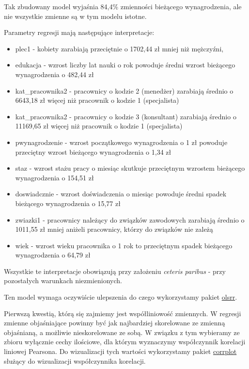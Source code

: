 \documentclass[]{book}
\providecommand{\tightlist}{%
  \setlength{\itemsep}{0pt}\setlength{\parskip}{0pt}}
\begin{document}
Tak zbudowany model wyjaśnia 84,4\% zmienności bieżącego wynagrodzenia, ale nie wszystkie zmienne są w tym modelu istotne.

Parametry regresji mają następujące interpretacje:

\begin{itemize}
\tightlist
\item
  plec1 - kobiety zarabiają przeciętnie o 1702,44 zł mniej niż mężczyźni,
\item
  edukacja - wzrost liczby lat nauki o rok powoduje średni wzrost bieżącego wynagrodzenia o 482,44 zł
\item
  kat\_pracownika2 - pracownicy o kodzie 2 (menedżer) zarabiają średnio o 6643,18 zł więcej niż pracownik o kodzie 1 (specjalista)
\item
  kat\_pracownika2 - pracownicy o kodzie 3 (konsultant) zarabiają średnio o 11169,65 zł więcej niż pracownik o kodzie 1 (specjalista)
\item
  pwynagrodzenie - wzrost początkowego wynagrodzenia o 1 zł powoduje przeciętny wzrost bieżącego wynagrodzenia o 1,34 zł
\item
  staz - wzrost stażu pracy o miesiąc skutkuje przeciętnym wzrostem bieżącego wynagrodzenia o 154,51 zł
\item
  doswiadcznie - wzrost doświadczenia o miesiąc powoduje średni spadek bieżącego wynagrodzenia o 15,77 zł
\item
  zwiazki1 - pracownicy należący do związków zawodowych zarabiają średnio o 1011,55 zł mniej aniżeli pracownicy, którzy do związków nie zależą
\item
  wiek - wzrost wieku pracownika o 1 rok to przeciętnym spadek bieżącego wynagrodzenia o 64,79 zł
\end{itemize}

Wszystkie te interpretacje obowiązują przy założeniu \emph{ceteris paribus} - przy pozostałych warunkach niezmienionych.

Ten model wymaga oczywiście ulepszenia do czego wykorzystamy pakiet \href{https://cran.r-project.org/web/packages/olsrr/index.html}{olsrr}.

Pierwszą kwestią, którą się zajmiemy jest współliniowość zmiennych. W regresji zmienne objaśniające powinny być jak najbardziej skorelowane ze zmienną objaśnianą, a możliwie nieskorelowane ze sobą. W związku z tym wybieramy ze zbioru wyłącznie cechy ilościowe, dla którym wyznaczymy współczynnik korelacji liniowej Pearsona. Do wizualizacji tych wartości wykorzystamy pakiet \href{https://cran.r-project.org/web/packages/corrplot/}{corrplot} służący do wizualizacji współczynnika korelacji.
\end{document}
